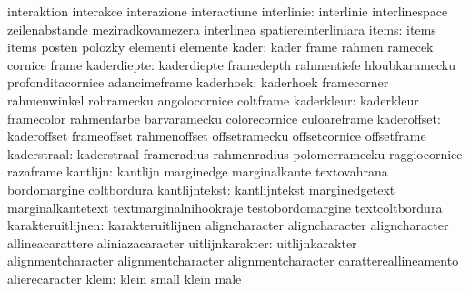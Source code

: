                            interaktion               interakce
                           interazione               interactiune
               interlinie: interlinie                interlinespace
                           zeilenabstande            meziradkovamezera
                           interlinea                spatiereinterliniara
                    items: items                     items
                           posten                    polozky
                           elementi                  elemente
                    kader: kader                     frame
                           rahmen                    ramecek
                           cornice                   frame
              kaderdiepte: kaderdiepte               framedepth
                           rahmentiefe               hloubkaramecku
                           profonditacornice         adancimeframe
                kaderhoek: kaderhoek                 framecorner
                           rahmenwinkel              rohramecku
                           angolocornice             coltframe
               kaderkleur: kaderkleur                framecolor
                           rahmenfarbe               barvaramecku
                           colorecornice             culoareframe
              kaderoffset: kaderoffset               frameoffset
                           rahmenoffset              offsetramecku
                           offsetcornice             offsetframe
              kaderstraal: kaderstraal               frameradius
                           rahmenradius              polomerramecku
                           raggiocornice             razaframe
                 kantlijn: kantlijn                  marginedge
                           marginalkante             textovahrana
                           bordomargine              coltbordura
            kantlijntekst: kantlijntekst             marginedgetext
                           marginalkantetext         textmarginalnihookraje
                           testobordomargine         textcoltbordura
        karakteruitlijnen: karakteruitlijnen         aligncharacter
                           aligncharacter            aligncharacter
                           allineacarattere          aliniazacaracter %
          uitlijnkarakter: uitlijnkarakter           alignmentcharacter
                           alignmentcharacter        alignmentcharacter
                           carattereallineamento     alierecaracter %
                    klein: klein                     small
                           klein                     male
